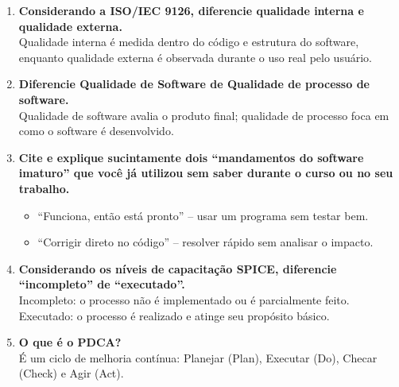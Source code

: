 \documentclass[12pt]{article}
\begin{document}
\begin{enumerate}[label=\textbf{\arabic*.}]
  \item \textbf{Considerando a \textsc{ISO/IEC} 9126, diferencie qualidade interna e qualidade externa.} \\
    Qualidade interna é medida dentro do código e estrutura do software, enquanto qualidade externa é observada durante o uso real pelo usuário.

  \item \textbf{Diferencie Qualidade de Software de Qualidade de processo de software.} \\
    Qualidade de software avalia o produto final; qualidade de processo foca em como o software é desenvolvido.

  \item \textbf{Cite e explique sucintamente dois “mandamentos do software imaturo” que você já utilizou sem saber durante o curso ou no seu trabalho.} \\
    \begin{itemize}
      \item “Funciona, então está pronto” – usar um programa sem testar bem.
      \item “Corrigir direto no código” – resolver rápido sem analisar o impacto.
    \end{itemize}

  \item \textbf{Considerando os níveis de capacitação \textsc{SPICE}, diferencie “incompleto” de “executado”.} \\
    Incompleto: o processo não é implementado ou é parcialmente feito. \\
    Executado: o processo é realizado e atinge seu propósito básico.

  \item \textbf{O que é o PDCA?} \\
    É um ciclo de melhoria contínua: Planejar (Plan), Executar (Do), Checar (Check) e Agir (Act).
\end{enumerate}
\end{document}
